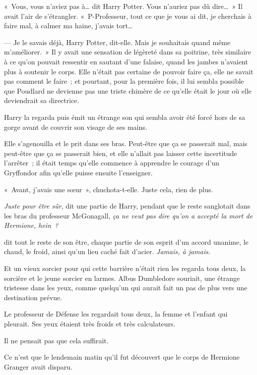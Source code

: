 «~Vous, vous n'aviez pas à… dit Harry Potter. Vous n'auriez pas dû dire…~» Il avait l'air de s'étrangler. «~P-Professeur, tout ce que je vous ai dit, je cherchais à faire mal, à calmer ma haine, j'avais tort…

--- Je le savais déjà, Harry Potter, dit-elle. Mais je souhaitais quand même m'améliorer.~» Il y avait une sensation de légèreté dans sa poitrine, très similaire à ce qu'on pouvait ressentir en sautant d'une falaise, quand les jambes n'avaient plus à soutenir le corps. Elle n'était pas certaine de pouvoir faire ça, elle ne savait pas comment le faire~; et pourtant, pour la première fois, il lui sembla possible que Poudlard ne devienne pas une triste chimère de ce qu'elle était le jour où elle deviendrait sa directrice.

Harry la regarda puis émit un étrange son qui sembla avoir été forcé hors de sa gorge avant de couvrir son visage de ses mains.

Elle s'agenouilla et le prit dans ses bras. Peut-être que ça se passerait mal, mais peut-être que ça se passerait bien, et elle n'allait pas laisser cette incertitude l'arrêter~; il était temps qu'elle commence à apprendre le courage d'un Gryffondor afin qu'elle puisse ensuite l'enseigner.

«~Avant, j'avais une sœur~», chuchota-t-elle. Juste cela, rien de plus.

\later

\emph{Juste pour être sûr}, dit une partie de Harry, pendant que le reste sanglotait dans les bras du professeur McGonagall, \emph{ça ne veut pas dire qu'on a accepté la mort de Hermione, hein~?}

\emph{} dit tout le reste de son être, chaque partie de son esprit d'un accord unanime, le chaud, le froid, ainsi qu'un lieu caché fait d'acier. \emph{Jamais, à jamais.}

\later

Et un vieux sorcier pour qui cette barrière n'était rien les regarda tous deux, la sorcière et le jeune sorcier en larmes. Albus Dumbledore souriait, une étrange tristesse dans les yeux, comme quelqu'un qui aurait fait un pas de plus vers une destination prévue.

\later

Le professeur de Défense les regardait tous deux, la femme et l'enfant qui pleurait. Ses yeux étaient très froids et très calculateurs.

Il ne pensait pas que cela suffirait.

\later

Ce n'est que le lendemain matin qu'il fut découvert que le corps de Hermione Granger avait disparu.
